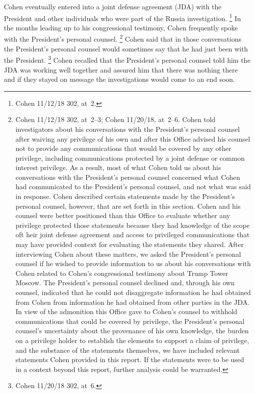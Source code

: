 {Cohen eventually entered into a joint defense agreement (JDA) with the President and other individuals who were part of the Russia investigation.%
\footnote{Cohen 11/12/18 302, at~2.}
In the months leading up to his congressional testimony, Cohen frequently spoke with the President's personal counsel.%
\footnote{Cohen 11/12/18 302, at~2--3;
Cohen 11/20/18, at~2--6.
Cohen told investigators about his conversations with the President's personal counsel after waiving any privilege of his own and after this Office advised his counsel not to provide any communications that would be covered by any other privilege, including communications protected by a joint defense or common interest privilege.
As a result, most of what Cohen told us about his conversations with the President's personal counsel concerned what Cohen had communicated to the President's personal counsel, and not what was said in response.
Cohen described certain statements made by the President's personal counsel, however, that are set forth in this section.
Cohen and his counsel were better positioned than this Office to evaluate whether any privilege protected those statements because they had knowledge of the scope oft heir joint defense agreement and access to privileged communications that may have provided context for evaluating the statements they shared.
After interviewing Cohen about these matters, we asked the President's personal counsel if he wished to provide information to us about his conversations with Cohen related to Cohen's congressional testimony about Trump Tower Moscow.
The President's personal counsel declined and, through his own counsel, indicated that he could not disaggregate information he had obtained from Cohen from information he had obtained from other parties in the JDA\null.
In view of the admonition this Office gave to Cohen's counsel to withhold communications that could be covered by privilege, the President's personal counsel's uncertainty about the provenance of his own knowledge, the burden on a privilege holder to establish the elements to support a claim of privilege, and the substance of the statements themselves, we have included relevant statements Cohen provided in this report.
If the statements were to be used in a context beyond this report, further analysis could be warranted.}
Cohen said that in those conversations the President's personal counsel would sometimes say that he had just been with the President.%
\footnote{Cohen 11/20/18 302, at~6.}
Cohen recalled that the President's personal counsel told him the JDA was working well together and assured him that there was nothing there and if they stayed on message the investigations would come to an end soon.%
}
